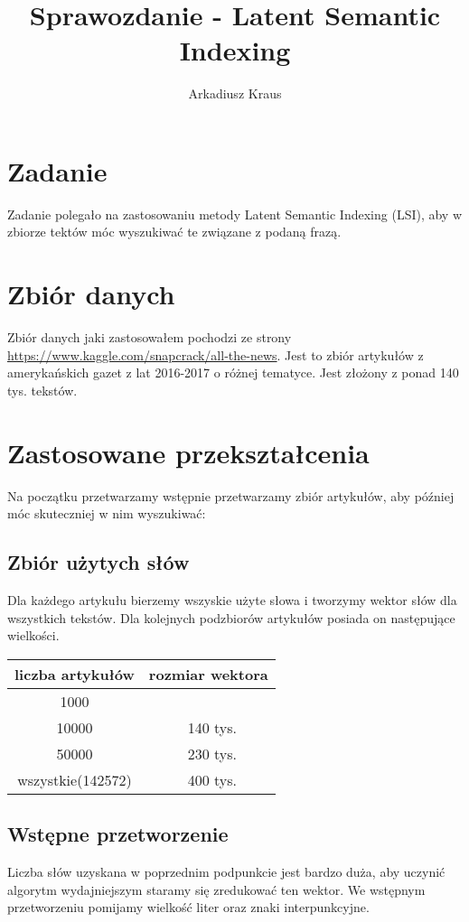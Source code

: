 \documentclass{article}
\begin{document}
\title{Sprawozdanie - Latent Semantic Indexing}
\author{Arkadiusz Kraus}

\maketitle


\section{Zadanie}
Zadanie polegało na zastosowaniu metody Latent Semantic Indexing (LSI), aby w zbiorze tektów móc wyszukiwać te związane z podaną frazą.

\section{Zbiór danych}
Zbiór danych jaki zastosowałem pochodzi ze strony \url{https://www.kaggle.com/snapcrack/all-the-news}. Jest to zbiór artykułów z amerykańskich gazet z lat 2016-2017 o różnej tematyce. Jest złożony z ponad 140 tys. tekstów.

\section{Zastosowane przekształcenia}
Na początku przetwarzamy wstępnie przetwarzamy zbiór artykułów, aby później móc skuteczniej w nim wyszukiwać:
\subsection{Zbiór użytych słów}
Dla każdego artykułu bierzemy wszyskie użyte słowa i tworzymy wektor słów dla wszystkich tekstów. Dla kolejnych podzbiorów artykułów posiada on następujące wielkości.
\begin{center}
	\begin{tabular}{c|c}
	liczba artykułów & rozmiar wektora \\ \hline
	1000 &  \\ \hline
	10000 & ~140 tys.\\ \hline
	50000 & ~230 tys.\\ \hline
	wszystkie(142572) & ~400 tys.\\
	\end{tabular}
\end{center}
\subsection{Wstępne przetworzenie}
Liczba słów uzyskana w poprzednim podpunkcie jest bardzo duża, aby uczynić algorytm wydajniejszym staramy się zredukować ten wektor. We wstępnym przetworzeniu pomijamy wielkość liter oraz znaki interpunkcyjne.
\end{document}

